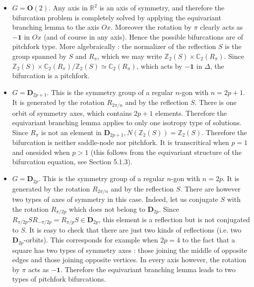 \documentclass{scrartcl}
\begin{document}
    \begin{itemize}
      \item \(G=\mathbf{O}(2)\).
        Any axis in \(\mathbb{R}^{2}\) is an axis of symmetry, and therefore the bifurcation problem is completely solved by applying the equivariant branching lemma to the axis \(O x\).
        Moreover the rotation by \(\pi\) clearly acts as \(\mathbf{- 1}\) in \(O x\) (and of course in any axis).
        Hence the possible bifurcations are of pitchfork type.
        More algebraically : the normalizer of the reflection \(S\) is the group spanned by \(S\) and \(R_{\pi}\), which we may write \(\mathbb{Z}_{2}(S) \times \mathbb{C}_{2}\left(R_{\pi}\right)\).
        Since \(\mathbb{Z}_{2}(S) \times \mathbb{C}_{2}\left(R_{\pi}\right) / \mathbb{Z}_{2}(S) \simeq \mathbb{C}_{2}\left(R_{\pi}\right)\), which acts by \(-\mathbf{1}\) in \(\Delta\), the bifurcation is a pitchfork.
      \item \(G=\mathbf{D}_{2 p + 1}\).
        This is the symmetry group of a regular \(n\)-gon with \(n = 2 p + 1\).
        It is generated by the rotation \(R_{2 \pi / n}\) and by the reflection \(S\).
        There is one orbit of symmetry axes, which contains \(2 p + 1\) elements.
        Therefore the equivariant branching lemma applies to only one isotropy type of solutions.
        Since \(R_{\pi}\) is not an element in \(\mathbf{D}_{2 p + 1}, N\left(\mathbb{Z}_{2}(S)\right)=\mathbb{Z}_{2}(S)\).
        Therefore the bifurcation is neither saddle-node nor pitchfork.
        It is transcritical when \(p = 1\) and onesided when \(p>1\) (this follows from the equivariant structure of the bifurcation equation, see Section 5.1.3).
      \item \(G=\mathbf{D}_{2 p}\).
        This is the symmetry group of a regular \(n\)-gon with \(n = 2 p\).
        It is generated by the rotation \(R_{2 \pi / n}\) and by the reflection \(S\).
        There are however two types of axes of symmetry in this case.
        Indeed, let us conjugate \(S\) with the rotation \(R_{\pi / 2 p}\) which does not belong to \(\mathbf{D}_{2 p}\).
        Since \(R_{\pi / 2 p} S R_{-\pi / 2 p}=R_{\pi / p} S \in \mathbf{D}_{2 p}\), this element is a reflection but is not conjugated to \(S\).
        It is easy to check that there are just two kinds of reflections (i.e. two \(\mathbf{D}_{2 p}\)-orbits).
        This corresponds for example when \(2 p = 4\) to the fact that a square has two types of symmetry axes : those joining the middle of opposite edges and those joining opposite vertices.
        In every axis however, the rotation by \(\pi\) acts as \(\mathbf{- 1}\).
        Therefore the equivariant branching lemma leads to two types of pitchfork bifurcations.
    \end{itemize}
\end{document}

